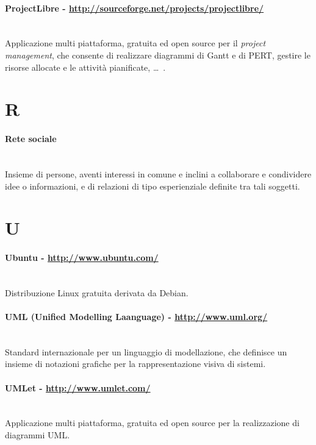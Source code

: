 \paragraph{ProjectLibre - \url{http://sourceforge.net/projects/projectlibre/}} \hfill \\
Applicazione multi piattaforma, gratuita ed open source per il \textit{project management}, che consente di realizzare diagrammi di Gantt e di PERT, gestire le risorse allocate e le attività pianificate, \ldots\ .

\section*{R}
\paragraph{Rete sociale} \hfill \\
Insieme di persone, aventi interessi in comune e inclini a collaborare e condividere idee o informazioni, e di relazioni di tipo esperienziale definite tra tali soggetti.

\section*{U}
\paragraph{Ubuntu - \url{http://www.ubuntu.com/}} \hfill \\
Distribuzione Linux gratuita derivata da Debian.
\paragraph{UML (Unified Modelling Laanguage) - \url{http://www.uml.org/}} \hfill \\
Standard internazionale per un linguaggio di modellazione, che definisce un insieme di notazioni grafiche per la rappresentazione visiva di sistemi.
\paragraph{UMLet - \url{http://www.umlet.com/}} \hfill \\
Applicazione multi piattaforma, gratuita ed open source per la realizzazione di diagrammi UML.
